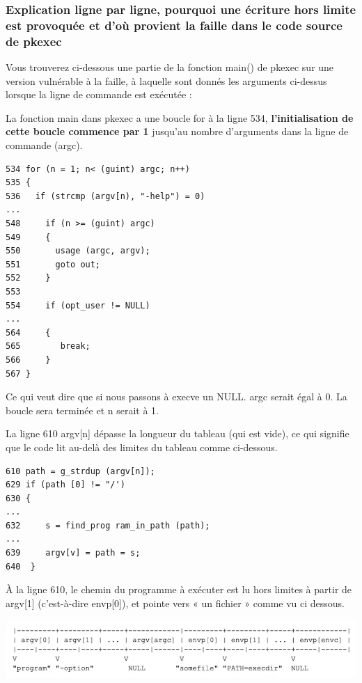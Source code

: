 \documentclass[12pt,a4paper]{article}
\begin{document}
\begin{flushleft}
            \subsubsection{Explication ligne par ligne, pourquoi une écriture hors limite est provoquée et d'où provient la faille dans le code source de pkexec}
                \item  Vous trouverez ci-dessous une partie de la fonction main() de pkexec sur une version vulnérable à la faille, à laquelle sont donnés les arguments ci-dessus lorsque la ligne de commande est exécutée :
                \item La fonction main{} dans pkexec a une boucle for à la ligne 534, \textbf{l'initialisation de cette boucle commence par 1} jusqu'au nombre d'arguments dans la ligne de commande (argc).
                \begin{lstlisting}
534 for (n = 1; n< (guint) argc; n++)
535 {
536   if (strcmp (argv[n), "-help") = 0)
...
548     if (n >= (guint) argc)
549     {
550       usage (argc, argv);  
551       goto out;
552     }
553
554     if (opt_user != NULL)
...
564     {
565        break;
566     }
567 }
                \end{lstlisting}
                \item Ce qui veut dire que si nous passons à execve un NULL. argc serait égal à 0. La boucle sera terminée et n serait à 1.
                \item La ligne 610 argv[n] dépasse la longueur du tableau (qui est vide), ce qui signifie que le code lit au-delà des limites du tableau comme ci-dessous.
                \begin{lstlisting}
610 path = g_strdup (argv[n]);
629 if (path [0] != "/')
630 {
...
632     s = find_prog ram_in_path (path);
...
639     argv[v] = path = s;
640  }
                \end{lstlisting}
                \item À la ligne 610, le chemin du programme à exécuter est lu hors limites à partir de argv[1] (c’est-à-dire envp[0]), et pointe vers « un fichier » comme vu ci dessous.
                \begin{center}
                    \includegraphics[scale=0.4]{image}                
                \end{center}

\end{flushleft}
\end{document}
